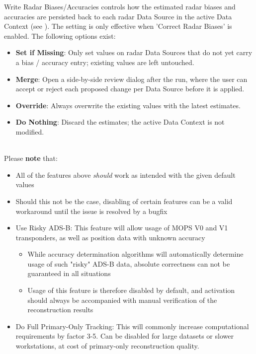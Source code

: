 Write Radar Biases/Accuracies controls how the estimated radar biases and accuracies are persisted back to each radar Data Source in the active Data Context (see ). The setting is only effective when 'Correct Radar Biases' is enabled. The following options exist:

\begin{itemize}
    \item \textbf{Set if Missing}: Only set values on radar Data Sources that do not yet carry a bias / accuracy entry; existing values are left untouched.
    \item \textbf{Merge}: Open a side-by-side review dialog after the run, where the user can accept or reject each proposed change per Data Source before it is applied.
    \item \textbf{Override}: Always overwrite the existing values with the latest estimates.
    \item \textbf{Do Nothing}: Discard the estimates; the active Data Context is not modified.
\end{itemize}
\ \\

Please \textbf{note} that:
\begin{itemize}
\item All of the features above \textit{should} work as intended with the given default values
\item Should this not be the case, disabling of certain features can be a valid workaround until the issue is resolved by a bugfix
\item Use Risky ADS-B: This feature will allow usage of MOPS V0 and V1 transponders, as well as position data with unknown accuracy
\begin{itemize}
\item While accuracy determination algorithms will automatically determine usage of such "risky" ADS-B data, absolute correctness can not be guaranteed in all situations
\item Usage of this feature is therefore disabled by default, and activation should always be accompanied with manual verification of the reconstruction results
\end{itemize}
\item Do Full Primary-Only Tracking: This will commonly increase computational requirements by factor 3-5. Can be disabled for large datasets or slower workstations, at cost of primary-only reconstruction quality.
\end{itemize}


